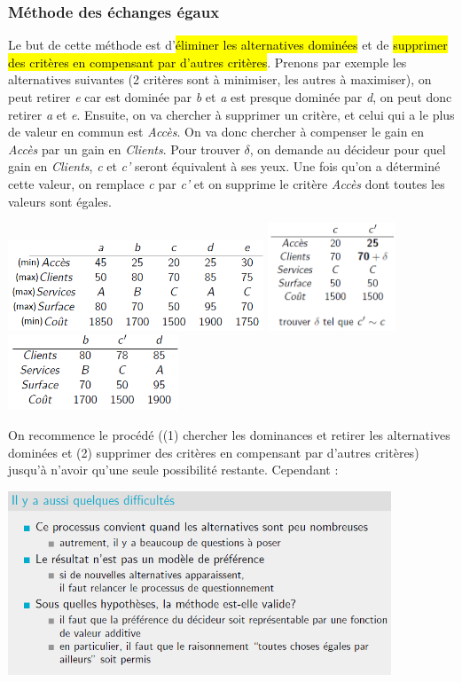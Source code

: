 \documentclass[a4paper, 12pt]{article}
\newcommand{\alinea}{
\hspace*{0.5cm}}
\begin{document}
		\subsubsection{Méthode des échanges égaux}
			\alinea Le but de cette méthode est d'\hl{éliminer les alternatives dominées} et de \hl{supprimer des critères en
				compensant par d'autres critères}. Prenons par exemple les alternatives suivantes (2 critères sont à minimiser, les
				autres à maximiser), on peut retirer \textit{e} car est dominée par \textit{b} et \textit{a} est presque 
				dominée par \textit{d}, on peut donc retirer \textit{a} et \textit{e}. Ensuite, on va chercher à supprimer 
				un critère, et celui qui a le plus de valeur en commun est \textit{Accès}. On va donc chercher à compenser
				le gain en \textit{Accès} par un gain en \textit{Clients}. Pour trouver $\delta$, on demande au décideur 
				pour quel gain en \textit{Clients}, \textit{c} et \textit{c'} seront équivalent à ses yeux.
				Une fois qu'on a déterminé cette valeur, on remplace \textit{c} par \textit{c'} et on supprime le critère
				\textit{Accès} dont toutes les valeurs sont égales.
			\begin{center}
				\includegraphics[width=3in]{Images/even_swaps1} \includegraphics[width=1.5in]{Images/even_swaps2}
				 \includegraphics[width=2in]{Images/even_swaps3}
			\end{center}
			\alinea On recommence le procédé ((1) chercher les dominances et retirer les alternatives dominées et (2) supprimer
				des critères en compensant par d'autres critères) jusqu'à n'avoir qu'une seule possibilité restante.
				Cependant : 
			\begin{center}
				\includegraphics[width=4.5in]{Images/even_swaps4}
			\end{center}
%
\end{document}
